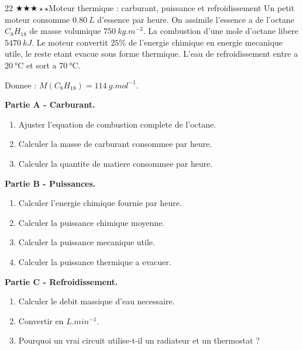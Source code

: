 \documentclass[11pt,a4paper]{article}
\newcommand{\diffthree}{\(\bigstar\bigstar\bigstar\star\star\)}
\begin{document}
\begin{probleme}{22 \diffthree}{Moteur thermique : carburant, puissance et refroidissement}
Un petit moteur consomme \(\SI{0.80}{L}\) d'essence par heure. On assimile l'essence a de l'octane \(C_8H_{18}\) de masse volumique \(\SI{750}{kg.m^{-3}}\). La combustion d'une mole d'octane libere \(\SI{5470}{kJ}\). Le moteur convertit \(25\%\) de l'energie chimique en energie mecanique utile, le reste etant evacue sous forme thermique. L'eau de refroidissement entre a \(\SI{20}{\celsius}\) et sort a \(\SI{70}{\celsius}\).

Donnee : \(M(C_8H_{18})=\SI{114}{g.mol^{-1}}\).

\textbf{Partie A - Carburant.}
\begin{enumerate}
\item Ajuster l'equation de combustion complete de l'octane.
\item Calculer la masse de carburant consommee par heure.
\item Calculer la quantite de matiere consommee par heure.
\end{enumerate}

\textbf{Partie B - Puissances.}
\begin{enumerate}[resume]
\item Calculer l'energie chimique fournie par heure.
\item Calculer la puissance chimique moyenne.
\item Calculer la puissance mecanique utile.
\item Calculer la puissance thermique a evacuer.
\end{enumerate}

\textbf{Partie C - Refroidissement.}
\begin{enumerate}[resume]
\item Calculer le debit massique d'eau necessaire.
\item Convertir en \(\si{L.min^{-1}}\).
\item Pourquoi un vrai circuit utilise-t-il un radiateur et un thermostat ?
\end{enumerate}
\end{probleme}
\end{document}
